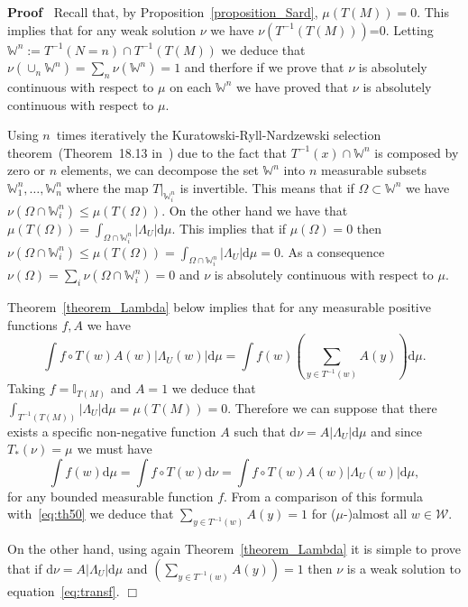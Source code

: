 \documentclass[a4paper,10pt]{article}
\newcommand{\assign}{:=}
\newcommand{\asterisk}{\mathord{*}}
\newcommand{\mathd}{\mathrm{d}}
\newcommand{\nobracket}{}
\newenvironment{proof}{\noindent\textbf{Proof\ }}{\hspace*{\fill}$\Box$\medskip}
\begin{document}
\begin{proof}
  Recall that, by Proposition~\ref{proposition_Sard}, $\mu (T (M)) = 0$. This
  implies that for any weak solution $\nu$ we have $\nu (T^{- 1} (T (M)))$=0.
  Letting $\mathbb{W}^n \assign T^{- 1} (N = n) \cap T^{- 1} (T (M))$ we
  deduce that $\nu (\cup_n \mathbb{W}^n) = \sum_n \nu (\mathbb{W}^n) = 1$ and
  therfore if we prove that $\nu$ is absolutely continuous with respect to
  $\mu$ on each $\mathbb{W}^n$ we have proved that $\nu$ is absolutely
  continuous with respect to $\mu$.
  
  Using $n$~times iteratively the Kuratowski-Ryll-Nardzewski selection
  theorem~(Theorem~18.13 in~{\cite{Aliprantis2006}}) due to the fact that
  $T^{- 1} (x) \cap \mathbb{W}^n$ is composed by zero or $n$ elements, we can
  decompose the set $\mathbb{W}^n$ into $n$ measurable subsets
  $\mathbb{W}^n_1, \ldots, \mathbb{W}^n_n$ where the map $\nobracket T
  |_{\mathbb{W}^n_i}$ is invertible. This means that if $\Omega \subset
  \mathbb{W}^n$ we have $\nu (\Omega \cap \mathbb{W}^n_i) \leqslant \mu (T
  (\Omega))$. On the other hand we have that $\mu (T (\Omega)) = \int_{\Omega
  \cap \mathbb{W}^n_i} | \Lambda_U | \mathd \mu$. This implies that if $\mu
  (\Omega) = 0$ then $\nu (\Omega \cap \mathbb{W}^n_i) \leqslant \mu (T
  (\Omega)) = \int_{\Omega \cap \mathbb{W}^n_i} | \Lambda_U | \mathd \mu = 0$.
  As a consequence $\nu (\Omega) = \sum_i \nu (\Omega \cap \mathbb{W}^n_i) =
  0$ and $\nu$ is absolutely continuous with respect to $\mu$.
  
  Theorem~\ref{theorem_Lambda} below implies that for any measurable positive
  functions $f, A$ we have
  \begin{equation}
    \int f \circ T (w) A (w) | \Lambda_U (w) | \mathd \mu = \int f (w) \left(
    \sum_{y \in T^{- 1} (w)} A (y) \right) \mathd \mu . \label{eq:th50}
  \end{equation}
  Taking $f =\mathbb{I}_{T (M)}$ and $A = 1$ we deduce that $\int_{T^{- 1} (T
  (M))} | \Lambda_U | \mathd \mu = \mu (T (M)) = 0$. Therefore we can suppose
  that there exists a specific non-negative function $A$ such that $\mathd \nu
  = A | \Lambda_U | \mathd \mu$ and since $T_{\asterisk} (\nu) = \mu^{}$ we
  must have
  \[ \int f (w) \mathd \mu = \int f \circ T (w) \mathd \nu = \int f \circ T
     (w) A (w) | \Lambda_U (w) | \mathd \mu, \]
  for any bounded measurable function $f$. From a comparison of this formula
  with~{\eqref{eq:th50}} we deduce that $\sum_{y \in T^{- 1} (w)} A (y) = 1$
  for ($\mu$-)almost all $w \in \mathcal{W}.$
  
  On the other hand, using again Theorem~\ref{theorem_Lambda} it is simple to
  prove that if $\mathd \nu = A | \Lambda_U | \mathd \mu$ and $\left( \sum_{y
  \in T^{- 1} (w)} A (y) \right) = 1$ then $\nu$ is a weak solution to
  equation~{\eqref{eq:transf}}.
\end{proof}
\end{document}
